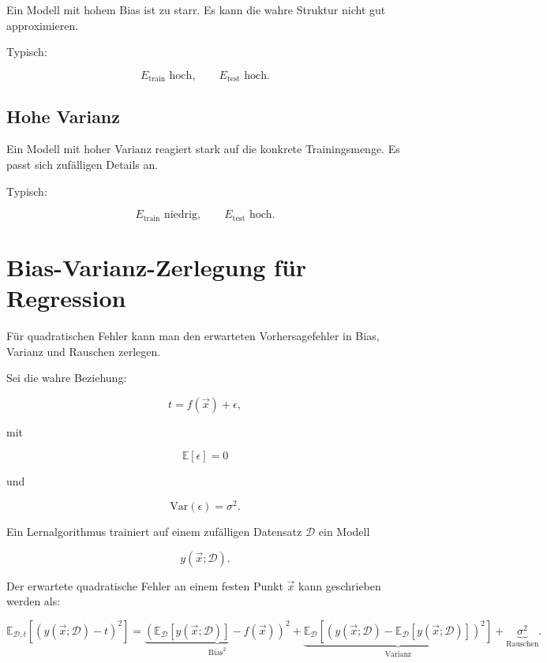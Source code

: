 Ein Modell mit hohem Bias ist zu starr.
Es kann die wahre Struktur nicht gut approximieren.

Typisch:

\[
    E_{\mathrm{train}}
    \text{ hoch},
    \qquad
    E_{\mathrm{test}}
    \text{ hoch}.
\]

\subsection{Hohe Varianz}

Ein Modell mit hoher Varianz reagiert stark auf die konkrete Trainingsmenge.
Es passt sich zufälligen Details an.

Typisch:

\[
    E_{\mathrm{train}}
    \text{ niedrig},
    \qquad
    E_{\mathrm{test}}
    \text{ hoch}.
\]

\section{Bias-Varianz-Zerlegung für Regression}

Für quadratischen Fehler kann man den erwarteten Vorhersagefehler in Bias, Varianz und Rauschen zerlegen.

Sei die wahre Beziehung:

\[
    t
    =
    f(\vec{x})
    +
    \epsilon,
\]

mit

\[
    \mathbb{E}[\epsilon]=0
\]

und

\[
    \mathrm{Var}(\epsilon)=\sigma^2.
\]

Ein Lernalgorithmus trainiert auf einem zufälligen Datensatz \(\mathcal{D}\) ein Modell

\[
    y(\vec{x};\mathcal{D}).
\]

Der erwartete quadratische Fehler an einem festen Punkt \(\vec{x}\) kann geschrieben werden als:

\[
    \mathbb{E}_{\mathcal{D},t}
    \left[
        (y(\vec{x};\mathcal{D})-t)^2
    \right]
    =
    \underbrace{
        \left(
            \mathbb{E}_{\mathcal{D}}[y(\vec{x};\mathcal{D})]
            -
            f(\vec{x})
        \right)^2
    }_{\text{Bias}^2}
    +
    \underbrace{
        \mathbb{E}_{\mathcal{D}}
        \left[
            \left(
                y(\vec{x};\mathcal{D})
                -
                \mathbb{E}_{\mathcal{D}}[y(\vec{x};\mathcal{D})]
            \right)^2
        \right]
    }_{\text{Varianz}}
    +
    \underbrace{\sigma^2}_{\text{Rauschen}}.
\]

